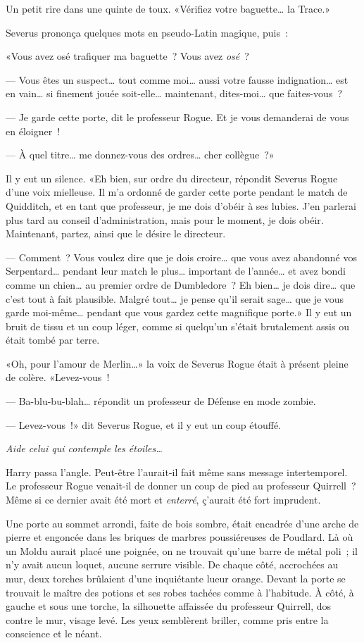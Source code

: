 Un petit rire dans une quinte de toux. «Vérifiez votre baguette… la Trace.»

Severus prononça quelques mots en pseudo-Latin magique, puis~:

«Vous avez osé trafiquer ma baguette~? Vous avez \emph{osé}~?

--- Vous êtes un suspect… tout comme moi… aussi votre fausse indignation… est en vain… si finement jouée soit-elle… maintenant, dites-moi… que faites-vous~?

--- Je garde cette porte, dit le professeur Rogue. Et je vous demanderai de vous en éloigner~!

--- À quel titre… me donnez-vous des ordres… cher collègue~?»

Il y eut un silence. «Eh bien, sur ordre du directeur, répondit Severus Rogue d'une voix mielleuse. Il m'a ordonné de garder cette porte pendant le match de Quidditch, et en tant que professeur, je me dois d'obéir à ses lubies. J'en parlerai plus tard au conseil d'administration, mais pour le moment, je dois obéir. Maintenant, partez, ainsi que le désire le directeur.

--- Comment~? Vous voulez dire que je dois croire… que vous avez abandonné vos Serpentard… pendant leur match le plus… important de l'année… et avez bondi comme un chien… au premier ordre de Dumbledore~? Eh bien… je dois dire… que c'est tout à fait plausible. Malgré tout… je pense qu'il serait sage… que je vous garde moi-même… pendant que vous gardez cette magnifique porte.» Il y eut un bruit de tissu et un coup léger, comme si quelqu'un s'était brutalement assis ou était tombé par terre.

«Oh, pour l'amour de Merlin…» la voix de Severus Rogue était à présent pleine de colère. «Levez-vous~!

--- Ba-blu-bu-blah… répondit un professeur de Défense en mode zombie.

--- Levez-vous~!» dit Severus Rogue, et il y eut un coup étouffé.

\emph{Aide celui qui contemple les étoiles…}

Harry passa l'angle. Peut-être l'aurait-il fait même sans message intertemporel. Le professeur Rogue venait-il de donner un coup de pied au professeur Quirrell~? Même si ce dernier avait été mort et \emph{enterré}, ç'aurait été fort imprudent.

Une porte au sommet arrondi, faite de bois sombre, était encadrée d'une arche de pierre et engoncée dans les briques de marbres poussiéreuses de Poudlard. Là où un Moldu aurait placé une poignée, on ne trouvait qu'une barre de métal poli~; il n'y avait aucun loquet, aucune serrure visible. De chaque côté, accrochées au mur, deux torches brûlaient d'une inquiétante lueur orange. Devant la porte se trouvait le maître des potions et ses robes tachées comme à l'habitude. À côté, à gauche et sous une torche, la silhouette affaissée du professeur Quirrell, dos contre le mur, visage levé. Les yeux semblèrent briller, comme pris entre la conscience et le néant.

